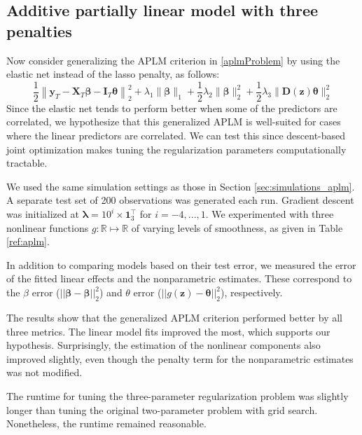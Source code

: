 \documentclass{statsoc}
\begin{document}
\subsection{Additive partially linear model with three penalties}
Now consider generalizing the APLM criterion in \eqref{aplmProblem} by using the elastic net instead of the lasso penalty, as follows:
\begin{equation}
\frac{1}{2} \left \|
\boldsymbol{y}_T
- \boldsymbol{X}_T\boldsymbol{\beta}
- \boldsymbol{I}_T \boldsymbol{\theta} \right \|^2_2
+ \lambda_1 \| \boldsymbol \beta \|_1
+ \frac{1}{2} \lambda_2 \| \boldsymbol \beta \|_2^2
+ \frac{1}{2} \lambda_3 \| \boldsymbol D(\boldsymbol z) \boldsymbol \theta \|_2^2
\end{equation}
Since the elastic net tends to perform better when some of the predictors are correlated, we hypothesize that this generalized APLM is well-suited for cases where the linear predictors are correlated. We can test this since descent-based joint optimization makes tuning the regularization parameters computationally tractable.

We used the same simulation settings as those in Section \ref{sec:simulations_aplm}. A separate test set of 200 observations was generated each run. Gradient descent was initialized at $\boldsymbol{\lambda} = 10^i \times \boldsymbol 1_3^\top$ for $i=-4, ..., 1$. We experimented with three nonlinear functions $g:\mathbb{R} \mapsto \mathbb{R}$ of varying levels of smoothness, as given in Table \ref{ref:aplm}.

In addition to comparing models based on their test error, we measured the error of the fitted linear effects and the nonparametric estimates. These correspond to the $\beta$ error ($||\boldsymbol \beta - \hat {\boldsymbol \beta}||_2^2$) and $\theta$ error ($|| g(\boldsymbol z) - \boldsymbol \theta ||_2^2$), respectively.

The results show that the generalized APLM criterion performed better by all three metrics. The linear model fits improved the most, which supports our hypothesis. Surprisingly, the estimation of the nonlinear components also improved slightly, even though the penalty term for the nonparametric estimates was not modified.

The runtime for tuning the three-parameter regularization problem was slightly longer than tuning the original two-parameter problem with grid search. Nonetheless, the runtime remained reasonable.
\end{document}
